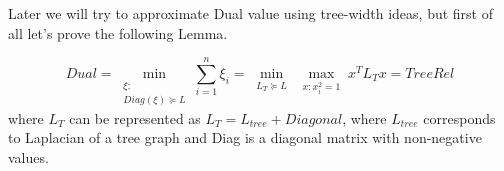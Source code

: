 \documentclass{article}
\DeclareMathOperator{\tr}{Tr}
\DeclareMathOperator{\mc}{\texttt{Max-Cut}}
\renewcommand{\le}{\ \leqslant\ }
\renewcommand{\ge}{\ \geqslant\ }
\begin{document}
Later we will try to approximate Dual value using tree-width ideas, but first of all let's prove the following Lemma.


\begin{lemma} 
$$Dual  =  \min_{\substack{\xi: \\  Diag(\xi) \succeq L}} \sum_{i=1}^n{\xi_i} = \min_{\substack{L_T \succeq L}} \max_{\substack{x: x_i^2 = 1}} x^T L_T x = TreeRel$$ where $L_T$ can be represented as $L_T = L_{tree} + Diagonal$, where $L_{tree}$ corresponds to Laplacian of a tree graph and Diag is a diagonal matrix with non-negative values.
\end{lemma}





\end{document}
